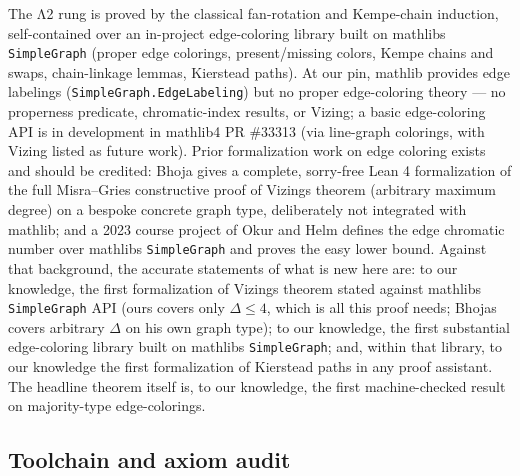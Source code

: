 \documentclass[11pt]{article}
\theoremstyle{definition}
\theoremstyle{remark}
\begin{document}
The Λ2 rung is proved by the classical fan-rotation and Kempe-chain induction, self-contained over an in-project edge-coloring library built on mathlib\textquotesingle s \texttt{SimpleGraph} (proper edge colorings, present/missing colors, Kempe chains and swaps, chain-linkage lemmas, Kierstead paths). At our pin, mathlib provides edge labelings (\texttt{SimpleGraph.EdgeLabeling}) but no proper edge-coloring theory --- no properness predicate, chromatic-index results, or Vizing; a basic edge-coloring API is in development in mathlib4 PR \#33313 (via line-graph colorings, with Vizing listed as future work). Prior formalization work on edge coloring exists and should be credited: Bhoja \cite{Bho} gives a complete, sorry-free Lean 4 formalization of the full Misra--Gries constructive proof of Vizing\textquotesingle s theorem (arbitrary maximum degree) on a bespoke concrete graph type, deliberately not integrated with mathlib; and a 2023 course project of Okur and Helm defines the edge chromatic number over mathlib\textquotesingle s \texttt{SimpleGraph} and proves the easy lower bound. Against that background, the accurate statements of what is new here are: to our knowledge, the first formalization of Vizing\textquotesingle s theorem stated against mathlib\textquotesingle s \texttt{SimpleGraph} API (ours covers only \(\Delta \le 4\), which is all this proof needs; Bhoja\textquotesingle s covers arbitrary \(\Delta\) on his own graph type); to our knowledge, the first substantial edge-coloring library built on mathlib\textquotesingle s \texttt{SimpleGraph}; and, within that library, to our knowledge the first formalization of Kierstead paths in any proof assistant. The headline theorem itself is, to our knowledge, the first machine-checked result on majority-type edge-colorings.

\subsection{Toolchain and axiom audit}\label{33-toolchain-and-axiom-audit}
\end{document}
